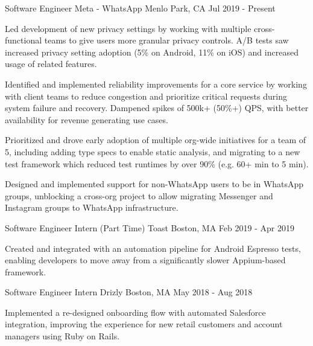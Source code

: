 
\begin{cventries}
  \cventry
    {Software Engineer} %
    {Meta - WhatsApp} %
    {Menlo Park, CA} %
    {Jul 2019 - Present} %
    {
      \begin{cvitems} %
        \item{Led development of new privacy settings by working with multiple cross-functional teams to give users more granular privacy controls. A/B tests saw increased privacy setting adoption (5\% on Android, 11\% on iOS) and increased usage of related features.}
        \item{Identified and implemented reliability improvements for a core service by working with client teams to reduce congestion and prioritize critical requests during system failure and recovery. Dampened spikes of 500k+ (50\%+) QPS, with better availability for revenue generating use cases.}
        \item{Prioritized and drove early adoption of multiple org-wide initiatives for a team of 5, including adding type specs to enable static analysis, and migrating to a new test framework which reduced test runtimes by over 90\% (e.g. 60+ min to 5 min).}
        \item{Designed and implemented support for non-WhatsApp users to be in WhatsApp groups, unblocking a cross-org project to allow migrating Messenger and Instagram groups to WhatsApp infrastructure.}
      \end{cvitems}
    }

  \cventry
    {Software Engineer Intern (Part Time)} %
    {Toast} %
    {Boston, MA} %
    {Feb 2019 - Apr 2019} %
    {
      \begin{cvitems} %
        \item {Created and integrated with an automation pipeline for Android Espresso tests, enabling developers to move away from a significantly slower Appium-based framework.}
      \end{cvitems}
    }

  \cventry
    {Software Engineer Intern} %
    {Drizly} %
    {Boston, MA} %
    {May 2018 - Aug 2018} %
    {
      \begin{cvitems} %
        \item {Implemented a re-designed onboarding flow with automated Salesforce integration, improving the experience for new retail customers and account managers using Ruby on Rails.}
      \end{cvitems}
    }


\end{cventries}
